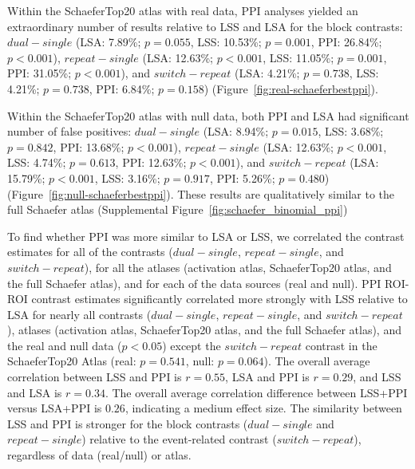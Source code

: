 \documentclass[phd,appendix,figures]{uithesis}
\begin{document}
Within the SchaeferTop20 atlas with real data, PPI analyses yielded an extraordinary number of results
relative to LSS and LSA for the block contrasts:
$dual - single$ (LSA: 7.89\%; $p = 0.055$, LSS: 10.53\%; $p = 0.001$, PPI: 26.84\%; $p < 0.001$),
$repeat - single$ (LSA: 12.63\%; $p < 0.001$, LSS: 11.05\%; $p = 0.001$, PPI: 31.05\%; $p < 0.001$), and
$switch - repeat$ (LSA: 4.21\%; $p = 0.738$, LSS: 4.21\%; $p = 0.738$, PPI: 6.84\%; $p = 0.158$) (Figure~\ref{fig:real-schaeferbestppi}).

Within the SchaeferTop20 atlas with null data, both PPI and LSA had significant number of false positives:
$dual - single$ (LSA: 8.94\%; $p = 0.015$, LSS: 3.68\%; $p = 0.842$, PPI: 13.68\%; $p < 0.001$),
$repeat - single$ (LSA: 12.63\%; $p < 0.001$, LSS: 4.74\%; $p = 0.613$, PPI: 12.63\%; $p < 0.001$), and
$switch - repeat$ (LSA: 15.79\%; $p < 0.001$, LSS: 3.16\%; $p = 0.917$, PPI: 5.26\%; $p = 0.480$) (Figure~\ref{fig:null-schaeferbestppi}).
These results are qualitatively similar to the full Schaefer atlas (Supplemental Figure~\ref{fig:schaefer_binomial_ppi})

To find whether PPI was more similar to LSA or LSS, we correlated the contrast estimates for all of the contrasts
($dual - single$, $repeat - single$, and $switch - repeat$), for all the atlases (activation atlas, SchaeferTop20 atlas, and the full Schaefer atlas), and
for each of the data sources (real and null).
PPI ROI-ROI contrast estimates significantly correlated more strongly with LSS relative to LSA
for nearly all contrasts ($dual - single$, $repeat - single$, and $switch - repeat$),
atlases (activation atlas, SchaeferTop20 atlas, and the full Schaefer atlas),
and the real and null data ($p < 0.05$) except the $switch - repeat$
contrast in the SchaeferTop20 Atlas (real: $p = 0.541$, null: $p = 0.064$).
The overall average correlation between LSS and PPI is $r = 0.55$, LSA and PPI is $r = 0.29$,
and LSS and LSA is $r = 0.34$.
The overall average correlation difference between LSS+PPI versus LSA+PPI is $0.26$,
indicating a medium effect size.
The similarity between LSS and PPI is stronger for the block contrasts ($dual - single$ and $repeat - single$)
relative to the event-related contrast ($switch - repeat$), regardless of data (real/null) or atlas.
\end{document}
